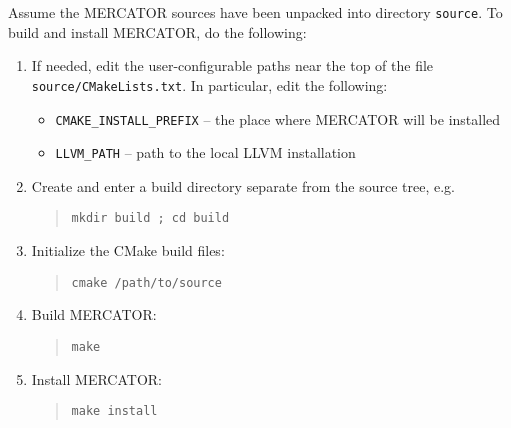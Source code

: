 \documentclass[11pt]{article}
\begin{document}
Assume the MERCATOR sources have been unpacked into directory
\texttt{source}.  To build and install MERCATOR, do the following:
\begin{enumerate}

\item If needed, edit the user-configurable paths near the top of the file
      \texttt{source/CMakeLists.txt}.  In particular, edit the following:
 \begin{itemize}
   \item \texttt{CMAKE_INSTALL_PREFIX} -- the place where MERCATOR will be
          installed
   \item \texttt{LLVM_PATH} -- path to the local LLVM installation
 \end{itemize}

\item Create and enter a build directory separate from the source tree, e.g.
\begin{quote}
\texttt{mkdir build ; cd build}
\end{quote}

\item Initialize the CMake build files:
\begin{quote}
\texttt{cmake /path/to/source}
\end{quote}

\item Build MERCATOR:
\begin{quote}
\texttt{make}
\end{quote}

\item Install MERCATOR:
\begin{quote}
\texttt{make install}
\end{quote}

\end{enumerate}
\end{document}
